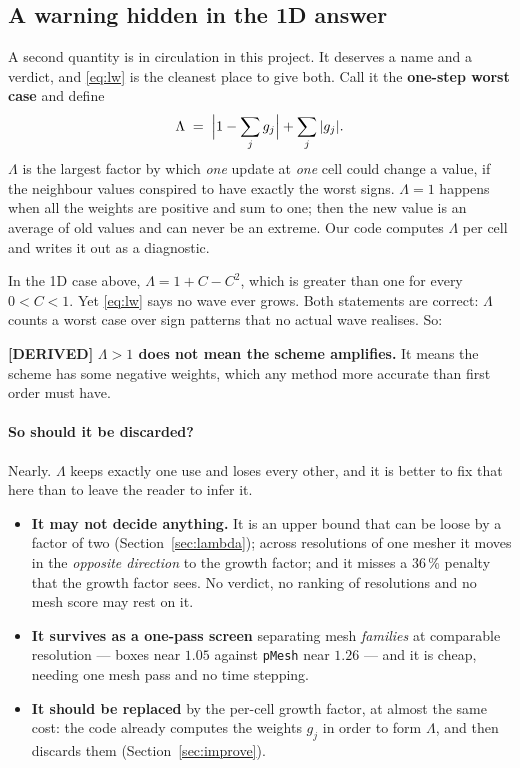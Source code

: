 \documentclass[11pt,a4paper]{article}
\newcommand{\derived}{\textcolor{blue!50!black}{\textbf{[DERIVED]}}}
\begin{document}
\subsection{A warning hidden in the 1D answer}
\label{sec:warning}

A second quantity is in circulation in this project. It deserves a name and a verdict, and
\eqref{eq:lw} is the cleanest place to give both. Call it the \textbf{one-step worst case} and
define
\begin{equation}
  \Lambda \;=\; \Bigl|1 - \sum_j g_j\Bigr| + \sum_j |g_j| .
  \label{eq:lambda}
\end{equation}
$\Lambda$ is the largest factor by which \emph{one} update at \emph{one} cell could change a
value, if the neighbour values conspired to have exactly the worst signs. $\Lambda = 1$
happens when all the weights are positive and sum to one; then the new value is an average of
old values and can never be an extreme. Our code computes $\Lambda$ per cell and writes it
out as a diagnostic.

In the 1D case above, $\Lambda = 1 + C - C^2$, which is greater than one for every
$0 < C < 1$. Yet \eqref{eq:lw} says no wave ever grows. Both statements are correct:
$\Lambda$ counts a worst case over sign patterns that no actual wave realises. So:

\derived{} \textbf{$\Lambda > 1$ does not mean the scheme amplifies.} It means the scheme has
some negative weights, which any method more accurate than first order must have.

\paragraph{So should it be discarded?} Nearly. $\Lambda$ keeps exactly one use and loses every
other, and it is better to fix that here than to leave the reader to infer it.

\begin{itemize}
\item \textbf{It may not decide anything.} It is an upper bound that can be loose by a factor of
      two (Section~\ref{sec:lambda}); across resolutions of one mesher it moves in the
      \emph{opposite direction} to the growth factor; and it misses a 36\,\% penalty that the
      growth factor sees. No verdict, no ranking of resolutions and no mesh score may rest on it.
\item \textbf{It survives as a one-pass screen} separating mesh \emph{families} at comparable
      resolution --- boxes near $1.05$ against \texttt{pMesh} near $1.26$ --- and it is cheap,
      needing one mesh pass and no time stepping.
\item \textbf{It should be replaced} by the per-cell growth factor, at almost the same cost: the
      code already computes the weights $g_j$ in order to form $\Lambda$, and then discards them
      (Section~\ref{sec:improve}).
\end{itemize}
\end{document}
